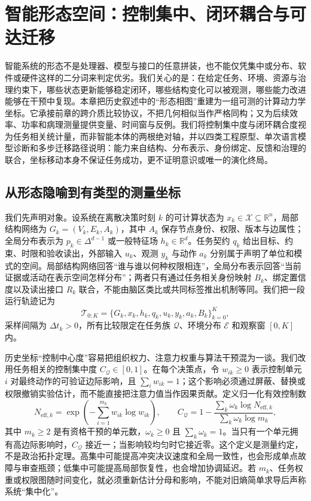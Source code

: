 \chapter{智能形态空间：控制集中、闭环耦合与可达迁移}
\label{chp:evolutionary_spectrum}

智能系统的形态不是处理器、模型与接口的任意拼装，也不能仅凭集中或分布、软件或硬件这样的二分词来判定优劣。我们关心的是：在给定任务、环境、资源与治理约束下，哪些状态更新能够稳定闭环，哪些结构变化可以被观测，哪些能力改进能够在干预中复现。本章把历史叙述中的“形态相图”重建为一组可测的计算动力学坐标。它承接前章的跨介质比较协议，不把几何相似当作严格同构；又为后续效率、功率和病理测量提供变量、时间窗与反例。我们将控制集中度与闭环耦合度视为任务相关统计量，而非智能本体的两根绝对轴，并以四类工程原型、单次语言模型诊断和多步迁移路径说明：能力来自结构、分布表示、身份绑定、反馈和治理的联合，坐标移动本身不保证任务成功，更不证明意识或唯一的演化终局。

\section{从形态隐喻到有类型的测量坐标}
\label{sec:section_2383}

我们先声明对象。设系统在离散决策时刻 $k$ 的可计算状态为 $x_k\in\mathcal X\subseteq\mathbb R^n$，局部结构网络为 $G_k=(V_k,E_k,A_k)$，其中 $A_k$ 保存节点身份、权限、版本与边属性；全局分布表示为 $p_k\in\Delta^{d-1}$ 或一般特征场 $h_k\in\mathbb R^d$。任务契约 $q_k$ 给出目标、约束、时限和验收读出，外部输入 $u_k$、观测 $y_k$ 与动作 $a_k$ 分别属于声明了单位和模式的空间。局部结构网络回答“谁与谁以何种权限相连”，全局分布表示回答“当前证据或活动在表示空间怎样分布”；两者只有通过任务相关身份映射 $B_k$、绑定置信度以及读出接口 $R_k$ 联合，不能由脑区类比或共同标签推出机制等同。我们把一段运行轨迹记为
\[
\mathcal T_{0:K}=\{G_k,x_k,h_k,q_k,u_k,y_k,a_k,B_k\}_{k=0}^{K},
\]
采样间隔为 $\Delta t_k>0$，所有比较限定在任务族 $\mathcal Q$、环境分布 $\mathcal E$ 和观察窗 $[0,K]$ 内。

历史坐标“控制中心度”容易把组织权力、注意力权重与算法干预混为一谈。我们改用任务相关的控制集中度 $C_{\mathcal Q}\in[0,1]$。在每个决策点，令 $w_{ik}\geq0$ 表示控制单元 $i$ 对最终动作的可验证边际影响，且 $\sum_i w_{ik}=1$；这个影响必须通过屏蔽、替换或权限撤销实验估计，而不能直接把注意力值当作因果贡献。定义归一化有效控制数
\[
N_{\mathrm{eff},k}=\exp\!\left(-\sum_{i=1}^{m_k}w_{ik}\log w_{ik}\right),\qquad
C_{\mathcal Q}=1-\frac{\sum_k\omega_k\log N_{\mathrm{eff},k}}
{\sum_k\omega_k\log m_k},
\]
其中 $m_k\geq2$ 是有资格干预的单元数，$\omega_k\geq0$ 且 $\sum_k\omega_k=1$。当只有一个单元拥有高边际影响时，$C_{\mathcal Q}$ 接近一；当影响较均匀时它接近零。这个定义是测量约定，不是政治拓扑定理。高集中可能提高冲突决议速度和全局一致性，也会形成单点故障与审查瓶颈；低集中可能提高局部恢复性，也会增加协调延迟。若 $m_k$、任务权重或权限图随时间变化，就必须重新估计分母和影响，不能对旧熵简单求导后声称系统“集中化”。

